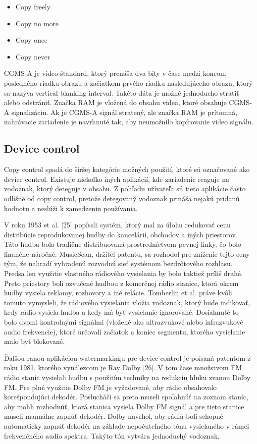 \begin{itemize}
\item Copy freely
\item Copy no more
\item Copy once
\item Copy never
\end{itemize}

CGMS-A je video štandard, ktorý prenáša dva bity v čase medzi koncom posledného riadku obrazu a začiatkom prvého riadku nasledujúceho obrazu, ktorý sa nazýva vertical blanking interval. Takéto dáta je možné jednoducho stratiť alebo odstrániť. Značka RAM je vložená do obsahu videa, ktoré obsahuje CGMS-A signalizáciu. Ak je CGMS-A signál stratený, ale značka RAM je prítomná, nahrávacie zariadenie je navrhnuté tak, aby neumožnilo kopírovanie video signálu. \cite{Cox}

\subsection{Device control}
Copy control spadá do širšej kategórie možných použití, ktoré sú označované ako device control. Existuje niekoľko iných aplikácií, kde zariadenie reaguje na vodoznak, ktorý deteguje v obsahu. Z pohľadu užívateľa sú tieto aplikácie často odlišné od copy control, pretože detegovaný vodoznak prináša nejakú pridanú hodnotu a neslúži k zamedzeniu používania.

V roku 1953 et al. [25] popísali systém, ktorý mal za úlohu redukovať cenu distribúcie reprodukovanej hudby do kancelárií, obchodov a iných priestorov. Táto hudba bola tradične distribuovaná prostredníctvom pevnej linky, čo bolo finančne náročné. MusicScan, držiteľ patentu, sa rozhodol pre zníženie tejto ceny tým, že nahradí vyhradenú rozvodnú sieť systémom bezdrôtového rozhlasu. Predsa len využitie vlastného rádiového vysielania by bolo taktiež príliš drahé. Preto priestory boli ozvučené hudbou z komerčnej rádio stanice, ktorá okrem hudby vysiela reklamy, rozhovory a iné relácie. Tomberlin et al. práve kvôli tomuto vymysleli, že rádiového vysielania vložia vodoznak, ktorý bude indikovať, kedy rádio vysiela hudba a kedy má byť vysielanie ignorované. Dosiahnuté to bolo dvomi kontrolnými signálmi (vložené ako ultrazvukové alebo infrazvukové audio frekvencie), ktoré určovali začiatok a koniec segmentu, ktorého vysielanie malo byť blokované.

Ďalšou ranou aplikáciou watermarkingu pre device control je poísaná patentom z roku 1981, ktorého vynálezcom je Ray Dolby [26]. V tom čase množstvom FM rádio staníc vysielali hudbu s použitím techniky na redukciu hluku zvanou Dolby FM. Pre plné využitie Dolby FM je vyžadované, aby rádio obsahovalo korešpondujúci dekodér. Poslucháči sa preto museli spoľahnúť na zoznam staníc, aby mohli rozhodnúť, ktorá stanica vysiela Dolby FM signál a pre tieto stanice museli manuálne zapnúť dekodér. Dolby navrhol, aby rádiá boli schopné automaticky zapnúť dekodér na základe nepočuteľného tónu vysielaného v rámci frekvenčného audio spektra. Takýto tón vytvára jednoduchý vodoznak.

